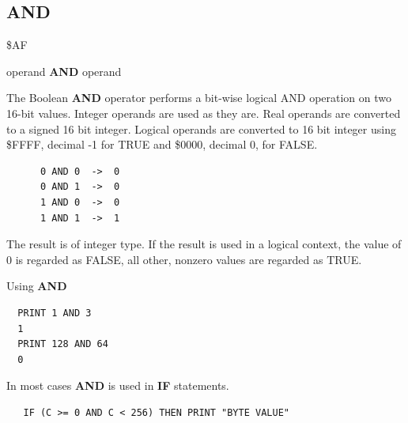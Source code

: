 
\newpage
\subsection{AND}
\begin{description}[leftmargin=2cm,style=nextline]
\item [Token:] \$AF
\item [Format:] operand {\bf AND} operand
\item [Usage:]  The Boolean {\bf AND} operator performs a bit-wise
                logical AND operation on two 16-bit values.
                Integer operands are used as they are.
                Real operands are converted to a signed 16 bit integer.
                Logical operands are converted to 16 bit integer
                using \$FFFF, decimal -1 for TRUE
                and \$0000, decimal 0, for FALSE.

   \begin{verbatim}
      0 AND 0  ->  0
      0 AND 1  ->  0
      1 AND 0  ->  0
      1 AND 1  ->  1
   \end{verbatim}

\item [Remarks:] The result is of integer type.
                 If the result is used in a logical context,
                 the value of 0 is regarded as FALSE,
                 all other, nonzero values are regarded as TRUE.
\item [Example:] Using {\bf AND}

\begin{tcolorbox}[colback=black,coltext=white]
\verbatimfont{\codefont}
\begin{verbatim}
  PRINT 1 AND 3
  1
  PRINT 128 AND 64
  0
\end{verbatim}
\end{tcolorbox}

In most cases {\bf AND} is used in {\bf IF} statements.

\begin{tcolorbox}[colback=black,coltext=white]
\verbatimfont{\codefont}
\begin{verbatim}
   IF (C >= 0 AND C < 256) THEN PRINT "BYTE VALUE"
\end{verbatim}
\end{tcolorbox}
\end{description}



